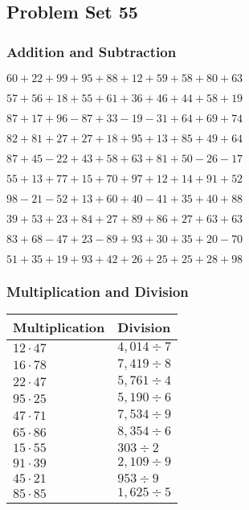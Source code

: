 \hypertarget{problem-set-55}{%
\subsection{Problem Set 55}\label{problem-set-55}}

\hypertarget{addition-and-subtraction}{%
\subsubsection{Addition and
Subtraction}\label{addition-and-subtraction}}

\(60+22+99+95+88+12+59+58+80+63\)

\(57+56+18+55+61+36+46+44+58+19\)

\(87+17+96-87+33-19-31+64+69+74\)

\(82+81+27+27+18+95+13+85+49+64\)

\(87+45-22+43+58+63+81+50-26-17\)

\(55+13+77+15+70+97+12+14+91+52\)

\(98-21-52+13+60+40-41+35+40+88\)

\(39+53+23+84+27+89+86+27+63+63\)

\(83+68-47+23-89+93+30+35+20-70\)

\(51+35+19+93+42+26+25+25+28+98\)

\hypertarget{multiplication-and-division}{%
\subsubsection{Multiplication and
Division}\label{multiplication-and-division}}

\begin{longtable}[]{@{}ll@{}}
\toprule
Multiplication & Division\tabularnewline
\midrule
\endhead
\(12\cdot47\) & \(4,014÷7\)\tabularnewline
\(16\cdot78\) & \(7,419÷8\)\tabularnewline
\(22\cdot47\) & \(5,761÷4\)\tabularnewline
\(95\cdot25\) & \(5,190÷6\)\tabularnewline
\(47\cdot71\) & \(7,534÷9\)\tabularnewline
\(65\cdot86\) & \(8,354÷6\)\tabularnewline
\(15\cdot55\) & \(303÷2\)\tabularnewline
\(91\cdot39\) & \(2,109÷9\)\tabularnewline
\(45\cdot21\) & \(953÷9\)\tabularnewline
\(85\cdot85\) & \(1,625÷5\)\tabularnewline
\bottomrule
\end{longtable}
